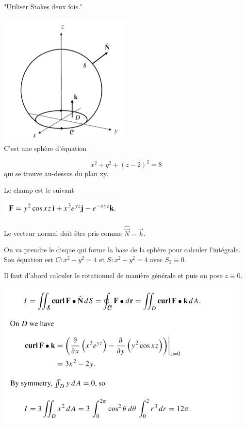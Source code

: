 "Utiliser Stokes deux fois."

\includegraphics[scale=0.6]{image2.png}\\%

C'est une sphère d'équation

\[x^2+y^2 + (z-2)^2 =8\] qui se trouve au-dessus du plan xy.

Le champ est le suivant
\begin{center}

\includegraphics[scale=0.7]{image4.png}\\
\end{center}
Le vecteur normal doit être pris comme $\hat{\vec N} = \vec k$.

On va prendre le disque qui forme la base de la sphère pour calculer l'intégrale. Son équation est $C : x^2 + y^2 = 4 $  et $S : x^2 + y^2 = 4 $ avec $S_2 \equiv 0 $.


Il faut d'abord calculer le rotationnel de manière générale et puis on pose $z\equiv 0$.

\includegraphics[scale=0.7]{image3.png}\\


